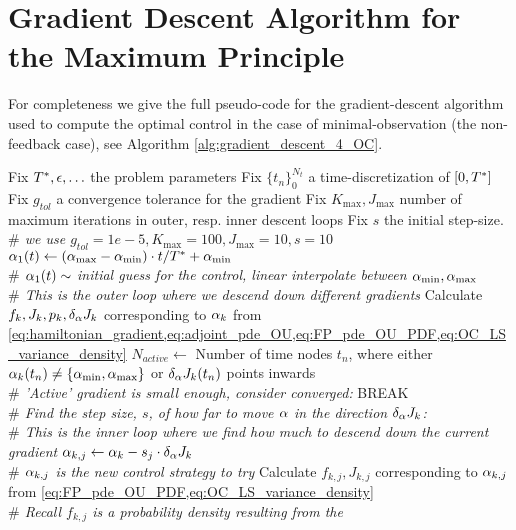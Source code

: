 \section{Gradient Descent Algorithm for the Maximum Principle}
For completeness we give the full pseudo-code for the gradient-descent algorithm
used to compute the optimal control in the case of minimal-observation (the
non-feedback case), see Algorithm \ref{alg:gradient_descent_4_OC}. 
\begin{algorithm}
\begin{algorithmic}
\State Fix ${ T^* }, {\epsilon}, \ldots$ the problem parameters
\State Fix $\{t_n\}_0^{N_t}$ a time-discretization of $[0,{ T^* }]$
\State Fix $g_{tol}$ a convergence tolerance for the gradient
\State Fix $K_{\max}, J_{\max}$ number of maximum iterations in outer, resp.
inner descent loops
\State Fix $s$ the initial step-size. 
\\ {\itshape $\#$ we use $g_{tol}=1e-5,K_{\max}=100,J_{\max}=10,s=10$}
\State $\alpha_1(t) \gets ({ \alpha_{\textrm{max}} }-{ \alpha_{\textrm{min}} }) \cdot t / { T^* } + { \alpha_{\textrm{min}} }$ 
\\{\itshape  $\#$ $\alpha_1(t) \sim$ initial guess for the control, linear
interpolate between ${ \alpha_{\textrm{min}} }, { \alpha_{\textrm{max}} }$}
\\ {\itshape $\#$ This is the outer loop where we descend down different
gradients}
 \State Calculate $f_k,J_{k},p_k, \delta_\alpha J_k$ corresponding to
	$\alpha_k$ from
	\cref{eq:hamiltonian_gradient,eq:adjoint_pde_OU,eq:FP_pde_OU_PDF,eq:OC_LS_variance_density}
	\State $N_{active}\gets$   Number of time nodes $t_n$, where either
	$\alpha_k(t_n) \neq \{{ \alpha_{\textrm{min}} }, { \alpha_{\textrm{max}} }\}$ or $\delta_\alpha J_k(t_n)$ points inwards
		  \\ {\itshape  $\#$ 'Active' gradient is small enough,
		 consider converged:}
		 \State BREAK
	\EndIf
	\\ {\itshape $\#$ Find the step size, $s$, of how far to move $\alpha$ in the
	direction $\delta_\alpha J_k$:}
	\\ {\itshape $\#$ This is the inner loop where we find how much to descend down
	the current gradient}
	\State $\alpha_{k,j} \gets \alpha_{k} - s_j \cdot \delta_\alpha J_k  $
	\\ {\itshape $\#$ $\alpha_{k,j}$ is the new control strategy to try}
	\State Calculate $f_{k,j}, J_{k,j}$ corresponding to
		$\alpha_{k,j}$ from	\cref{eq:FP_pde_OU_PDF,eq:OC_LS_variance_density}
	\\ {\itshape $\#$ Recall $f_{k,j}$ is a probability density resulting from the
}
\end{algorithmic}
\end{algorithm}

